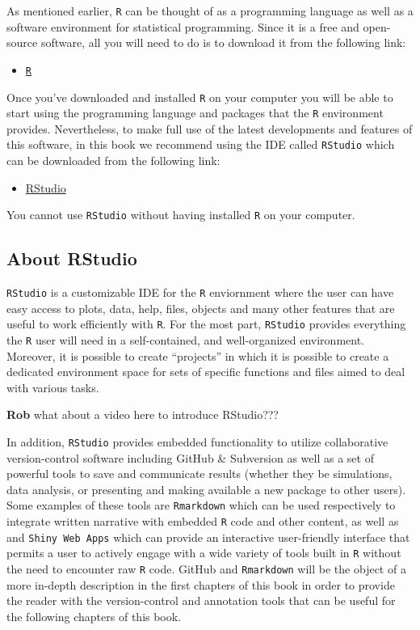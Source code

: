 \documentclass[]{book}
\providecommand{\tightlist}{%
  \setlength{\itemsep}{0pt}\setlength{\parskip}{0pt}}
\theoremstyle{definition}
\theoremstyle{definition}
\theoremstyle{remark}
\let\BeginKnitrBlock\begin \let\EndKnitrBlock\end
\begin{document}
As mentioned earlier, \texttt{R} can be thought of as a programming
language as well as a software environment for statistical programming.
Since it is a free and open-source software, all you will need to do is
to download it from the following link:

\begin{itemize}
\tightlist
\item
  \href{https://cran.r-project.org/}{\texttt{R}}
\end{itemize}

Once you've downloaded and installed \texttt{R} on your computer you
will be able to start using the programming language and packages that
the \texttt{R} environment provides. Nevertheless, to make full use of
the latest developments and features of this software, in this book we
recommend using the IDE called \texttt{RStudio} which can be downloaded
from the following link:

\begin{itemize}
\tightlist
\item
  \href{https://www.rstudio.com/}{RStudio}
\end{itemize}

\BeginKnitrBlock{rmdimportant}
You cannot use \texttt{RStudio} without having installed \texttt{R} on
your computer.
\EndKnitrBlock{rmdimportant}

\subsection{About RStudio}\label{about-rstudio}

\texttt{RStudio} is a customizable IDE for the \texttt{R} enviornment
where the user can have easy access to plots, data, help, files, objects
and many other features that are useful to work efficiently with
\texttt{R}. For the most part, \texttt{RStudio} provides everything the
\texttt{R} user will need in a self-contained, and well-organized
environment. Moreover, it is possible to create ``projects'' in which it
is possible to create a dedicated environment space for sets of specific
functions and files aimed to deal with various tasks.

\textbf{Rob} what about a video here to introduce RStudio???

In addition, \texttt{RStudio} provides embedded functionality to utilize
collaborative version-control software including GitHub \& Subversion as
well as a set of powerful tools to save and communicate results (whether
they be simulations, data analysis, or presenting and making available a
new package to other users). Some examples of these tools are
\texttt{Rmarkdown} which can be used respectively to integrate written
narrative with embedded \texttt{R} code and other content, as well as
and \texttt{Shiny\ Web\ Apps} which can provide an interactive
user-friendly interface that permits a user to actively engage with a
wide variety of tools built in \texttt{R} without the need to encounter
raw \texttt{R} code. GitHub and \texttt{Rmarkdown} will be the object of
a more in-depth description in the first chapters of this book in order
to provide the reader with the version-control and annotation tools that
can be useful for the following chapters of this book.
\end{document}

